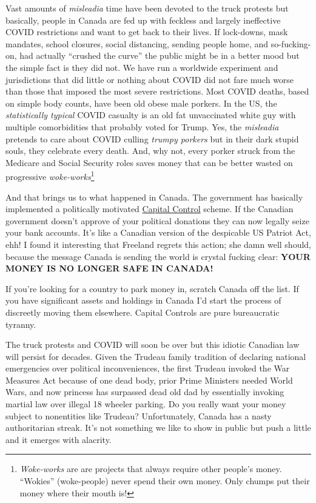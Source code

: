 Vast amounts of \emph{misleadia} time have been devoted to the truck
protests but basically, people in Canada are fed up with feckless and
largely ineffective COVID restrictions and want to get back to their
lives. If lock-downs, mask mandates, school closures, social distancing,
sending people home, and so-fucking-on, had actually ``crushed the
curve'' the public might be in a better mood but the simple fact is they
did not. We have run a worldwide experiment and jurisdictions that did
little or nothing about COVID did not fare much worse than those that
imposed the most severe restrictions. Most COVID deaths, based on simple
body counts, have been old obese male porkers. In the US, the
\emph{statistically typical} COVID casualty is an old fat unvaccinated
white guy with multiple comorbidities that probably voted for Trump.
Yes, the \emph{misleadia} pretends to care about COVID culling
\emph{trumpy porkers} but in their dark stupid souls, they celebrate
every death. And, why not, every porker struck from the Medicare and
Social Security roles saves money that can be better wasted on
progressive
\emph{woke-works}\footnote{\emph{Woke-works} are are projects that always require other people's
  money. ``Wokies'' (woke-people) never spend their own money. Only
  chumps put their money where their mouth
  is!} %

And that brings us to what happened in Canada. The government has
basically implemented a politically motivated
\href{https://corporatefinanceinstitute.com/resources/knowledge/economics/capital-controls/}{Capital
Control} scheme. If the Canadian government doesn't approve of your
political donations they can now legally seize your bank accounts. It's
like a Canadian version of the despicable US Patriot Act, ehh! I found
it interesting that Freeland regrets this action; she damn well should,
because the message Canada is sending the world is crystal fucking
clear: \textbf{YOUR MONEY IS NO LONGER SAFE IN CANADA!}

If you're looking for a country to park money in, scratch Canada off the
list. If you have significant assets and holdings in Canada I'd start
the process of discreetly moving them elsewhere. Capital Controls are
pure bureaucratic tyranny.

The truck protests and COVID will soon be over but this idiotic Canadian
law will persist for decades. Given the Trudeau family tradition of
declaring national emergencies over political inconveniences, the first
Trudeau invoked the War Measures Act because of one dead body, prior
Prime Ministers needed World Wars, and now princess has surpassed dead
old dad by essentially invoking martial law over illegal 18 wheeler
parking. Do you really want your money subject to nonentities like
Trudeau? Unfortunately, Canada has a nasty authoritarian streak. It's
not something we like to show in public but push a little and it emerges
with alacrity.

